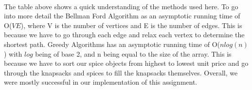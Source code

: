 \documentclass[letterpaper, 10pt,DIV=13]{scrartcl}
\numberwithin{equation}{section} %
\numberwithin{figure}{section} %
\numberwithin{table}{section} %
\begin{document}
\paragraph{} The table above shows a quick understanding of the methods used here. To go into more detail the Bellman Ford Algorithm as an asymptotic running time of  O($VE$), where V is the number of vertices and E is the number of edges. This is because we have to go through each edge and relax each vertex to determine the shortest path. Greedy Algorithms has an asymptotic running time of O($nlog(n)$) with $log$ being of base 2, and n being equal to the size of the array. This is because we have to sort our spice objects from highest to lowest unit price and go through the knapsacks and spices to fill the knapsacks themselves. Overall, we were mostly successful in our implementation of this assignment.





 

\pagebreak
\end{document}
